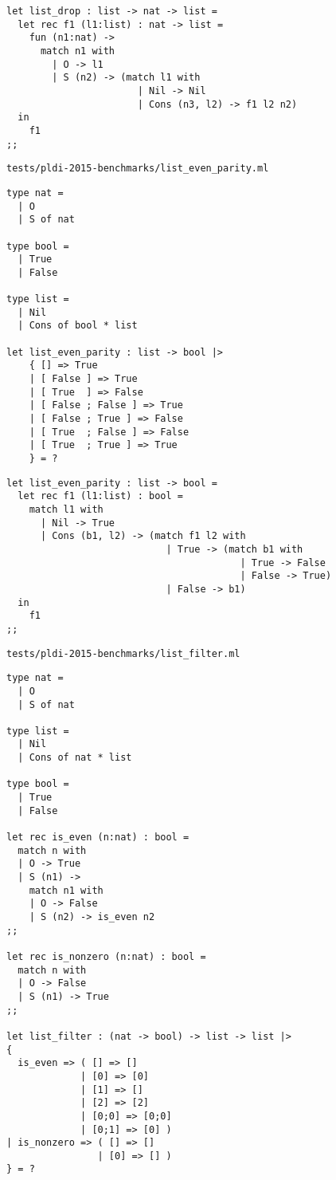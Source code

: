 \begin{verbatim}
let list_drop : list -> nat -> list =
  let rec f1 (l1:list) : nat -> list =
    fun (n1:nat) ->
      match n1 with
        | O -> l1
        | S (n2) -> (match l1 with
                       | Nil -> Nil
                       | Cons (n3, l2) -> f1 l2 n2)
  in
    f1
;;
\end{verbatim}

\noindent\large\texttt{tests/pldi-2015-benchmarks/list\_even\_parity.ml}
\begin{verbatim}
type nat =
  | O
  | S of nat

type bool =
  | True
  | False

type list =
  | Nil
  | Cons of bool * list

let list_even_parity : list -> bool |>
    { [] => True
    | [ False ] => True
    | [ True  ] => False
    | [ False ; False ] => True
    | [ False ; True ] => False
    | [ True  ; False ] => False
    | [ True  ; True ] => True
    } = ?
\end{verbatim}

\begin{verbatim}
let list_even_parity : list -> bool =
  let rec f1 (l1:list) : bool =
    match l1 with
      | Nil -> True
      | Cons (b1, l2) -> (match f1 l2 with
                            | True -> (match b1 with
                                         | True -> False
                                         | False -> True)
                            | False -> b1)
  in
    f1
;;
\end{verbatim}

\noindent\large\texttt{tests/pldi-2015-benchmarks/list\_filter.ml}
\begin{verbatim}
type nat =
  | O
  | S of nat

type list =
  | Nil
  | Cons of nat * list

type bool =
  | True
  | False

let rec is_even (n:nat) : bool =
  match n with
  | O -> True
  | S (n1) ->
    match n1 with
    | O -> False
    | S (n2) -> is_even n2
;;

let rec is_nonzero (n:nat) : bool =
  match n with
  | O -> False
  | S (n1) -> True
;;

let list_filter : (nat -> bool) -> list -> list |>
{
  is_even => ( [] => []
             | [0] => [0]
             | [1] => []
             | [2] => [2]
             | [0;0] => [0;0]
             | [0;1] => [0] )
| is_nonzero => ( [] => []
                | [0] => [] )
} = ?
\end{verbatim}

